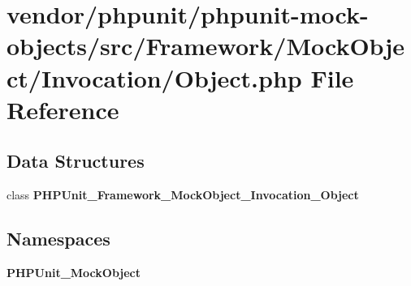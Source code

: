 \section{vendor/phpunit/phpunit-\/mock-\/objects/src/\+Framework/\+Mock\+Object/\+Invocation/\+Object.php File Reference}
\label{_object_8php}
\subsection*{Data Structures}
\begin{DoxyCompactItemize}
\item 
class {\bf P\+H\+P\+Unit\+\_\+\+Framework\+\_\+\+Mock\+Object\+\_\+\+Invocation\+\_\+\+Object}
\end{DoxyCompactItemize}
\subsection*{Namespaces}
\begin{DoxyCompactItemize}
\item 
 {\bf P\+H\+P\+Unit\+\_\+\+Mock\+Object}
\end{DoxyCompactItemize}

